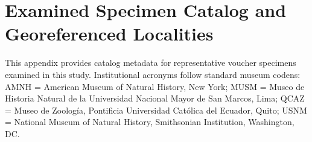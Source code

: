 
\chapter{Examined Specimen Catalog and Georeferenced Localities}
\label{app:specimens}

This appendix provides catalog metadata for representative voucher specimens examined in this study. Institutional acronyms follow standard museum codens: AMNH = American Museum of Natural History, New York; MUSM = Museo de Historia Natural de la Universidad Nacional Mayor de San Marcos, Lima; QCAZ = Museo de Zoolog{\'i}a, Pontificia Universidad Cat{\'o}lica del Ecuador, Quito; USNM = National Museum of Natural History, Smithsonian Institution, Washington, DC.

